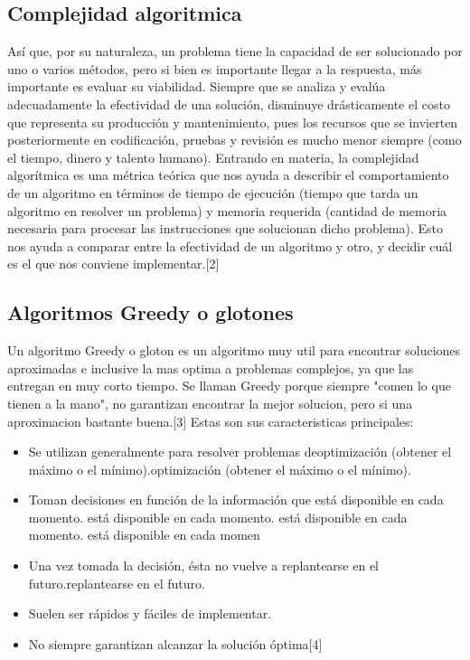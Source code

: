 \documentclass[spanish]{article}
\begin{document}
	\subsection{Complejidad algoritmica}
		Así que, por su naturaleza, un problema tiene la capacidad de ser solucionado por uno o varios métodos, pero si bien es importante llegar a la respuesta, más importante es evaluar su viabilidad. Siempre que se analiza y evalúa adecuadamente la efectividad de una solución, disminuye drásticamente el costo que representa su producción y mantenimiento, pues los recursos que se invierten posteriormente en codificación, pruebas y revisión es mucho menor siempre (como el tiempo, dinero y talento humano).	
		Entrando en materia, la complejidad algorítmica es una métrica teórica que nos ayuda a describir el comportamiento de un algoritmo en términos de tiempo de ejecución (tiempo que tarda un algoritmo en resolver un problema) y memoria requerida (cantidad de memoria necesaria para procesar las instrucciones que solucionan dicho problema). Esto nos ayuda a comparar entre la efectividad de un algoritmo y otro, y decidir cuál es el que nos conviene implementar.[2]
	\subsection{Algoritmos Greedy o glotones}	
		Un algoritmo Greedy o gloton es un algoritmo muy util para encontrar soluciones aproximadas e inclusive la mas optima a problemas complejos, ya que las entregan en muy corto tiempo. Se llaman Greedy porque siempre "comen lo que tienen a la mano", no garantizan encontrar la mejor solucion, pero si una aproximacion bastante buena.[3]
		Estas son sus caracteristicas principales:
		\begin{itemize}
			\item Se utilizan generalmente para resolver problemas deoptimización (obtener el máximo o el mínimo).optimización (obtener el máximo o el mínimo).
			\item Toman decisiones en función de la información que está disponible en cada momento. está disponible en cada momento. está disponible en cada momento. está disponible en cada momen
			\item Una vez tomada la decisión, ésta no vuelve a replantearse en el futuro.replantearse en el futuro.
			\item Suelen ser rápidos y fáciles de implementar.
			\item No siempre garantizan alcanzar la solución óptima[4]
		\end{itemize}
\end{document}
